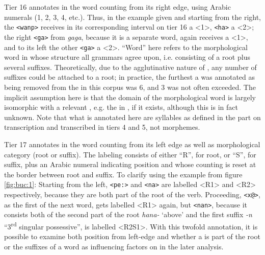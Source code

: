 \documentclass[output=paper]{LSP/langsci}
\begin{document}
Tier 16 annotates  in the word counting from its right edge, using Arabic numerals (1, 2, 3, 4, etc.). Thus, in the example given and starting from the right, the  \texttt{<wanp>} receives in its corresponding interval on tier 16 a <1>, \texttt{<ha>} a <2>; the right \texttt{<ga>} from \textit{gaga}, because it is a separate word, again receives a <1>, and to its left the other \texttt{<ga>} a <2>. “Word” here refers to the morphological word in  whose structure all grammars agree upon, i.e. consisting of a root plus several suffixes. Theoretically, due to the agglutinative nature of , any number of suffixes could be attached to a root; in practice, the furthest a  was annotated as being removed from the  in this corpus was 6, and 3 was not often exceeded. The implicit assumption here is that the domain of the morphological word is largely isomorphic with a relevant , e.g. the  in , if it exists, although this is in fact unknown. Note that what is annotated here are syllables as defined in the part on  transcription and transcribed in tiers 4 and 5, not morphemes.\largerpage[-1] 

Tier 17 annotates  in the word counting from its left edge as well as morphological category (root or suffix). The labeling consists of either “R”, for root, or “S”, for suffix, plus an Arabic numeral indicating position and whose counting is reset at the border between root and suffix. To clarify using the example from figure \ref{fig:buc:1}: Starting from the left, \texttt{<pe\textipa:>} and \texttt{<na>} are labelled <R1> and <R2> respectively, because they are both part of the root of the verb. Proceeding, \texttt{<x@>}, as the first  of the next word, gets labelled <R1> again, but \texttt{<nan>}, because it consists both of the second part of the root \textit{hana-} `above' and the first suffix \textit{-n} ``3\textsuperscript{rd} singular possessive'', is labelled <R2S1>. With this twofold annotation, it is possible to examine both position from left-edge  and whether a  is part of the root or the suffixes of a word as influencing factors on  in the later analysis.      
\end{document}
